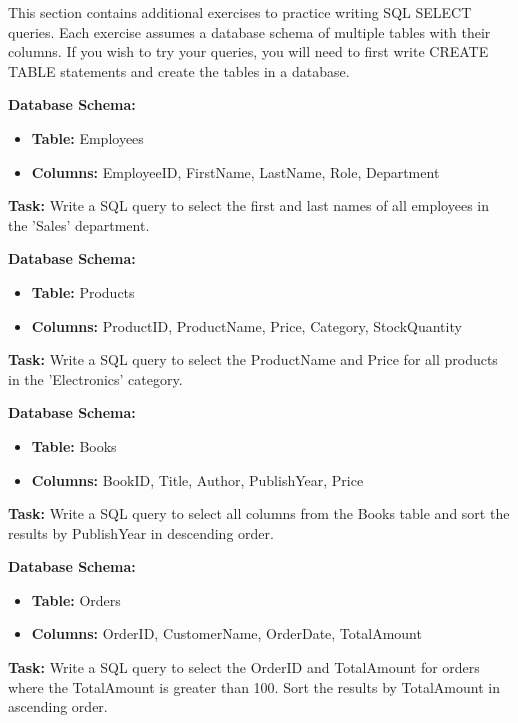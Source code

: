 This section contains additional exercises to practice writing SQL SELECT queries. Each exercise assumes a database schema of multiple tables with their columns. If you wish to try your queries, you will need to first write CREATE TABLE statements and create the tables in a database.

\begin{exerciseboxcomputer}
\textbf{Database Schema:} 
\begin{itemize}
    \item \textbf{Table:} Employees
    \item \textbf{Columns:} EmployeeID, FirstName, LastName, Role, Department
\end{itemize}

\noindent \textbf{Task:} Write a SQL query to select the first and last names of all employees in the 'Sales' department. \\
\end{exerciseboxcomputer}

\begin{exerciseboxcomputer}
\noindent \textbf{Database Schema:}
\begin{itemize}
    \item \textbf{Table:} Products
    \item \textbf{Columns:} ProductID, ProductName, Price, Category, StockQuantity
\end{itemize}

\noindent \textbf{Task:} Write a SQL query to select the ProductName and Price for all products in the 'Electronics' category.\\
\end{exerciseboxcomputer}

\begin{exerciseboxcomputer}
\noindent \textbf{Database Schema:}
\begin{itemize}
    \item \textbf{Table:} Books
    \item \textbf{Columns:} BookID, Title, Author, PublishYear, Price
\end{itemize}

\noindent \textbf{Task:} Write a SQL query to select all columns from the Books table and sort the results by PublishYear in descending order.\\
\end{exerciseboxcomputer}

\begin{exerciseboxcomputer}
\noindent \textbf{Database Schema:}
\begin{itemize}
    \item \textbf{Table:} Orders
    \item \textbf{Columns:} OrderID, CustomerName, OrderDate, TotalAmount
\end{itemize}

\noindent \textbf{Task:} Write a SQL query to select the OrderID and TotalAmount for orders where the TotalAmount is greater than 100. Sort the results by TotalAmount in ascending order.
\end{exerciseboxcomputer}

